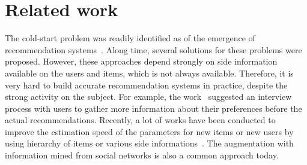 \documentclass[twoside,leqno,twocolumn]{article}
\begin{document}
%

\section{Related work}

The cold-start problem was readily identified as of the emergence of recommendation
systems~\cite{Schein:2002:MMC:564376.564421}. Along time, several solutions for these problems were
proposed. However, these approaches depend strongly on side information available on the users and
items, which is not always available. Therefore, it is very hard to build accurate recommendation
systems in practice, despite the strong activity on the subject. For example, the
work~\cite{Lashkari94collaborativeinterface} suggested an interview process with users to gather
more information about their preferences before the actual recommendations. Recently, a lot of
works have been conducted to improve the estimation speed of the parameters for new items or new
users by using hierarchy of items or various side
informations~\cite{DBLP:conf/nips/AgarwalCEMPRRZ08,contextualRecommendation,Agarwal:2009:SME:1526709.1526713}. The augmentation with information mined from social networks is also a common approach
today.
\end{document}
